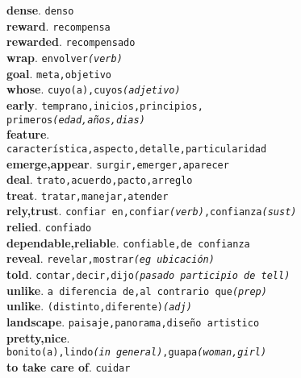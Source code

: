 \documentclass[twocolumn]{article}
\begin{document}
	\textsf{\textbf{dense}}. \texttt{denso}\\
	\textsf{\textbf{reward}}. \texttt{recompensa}\\
	\textsf{\textbf{rewarded}}. \texttt{recompensado}\\
	\textsf{\textbf{wrap}}. \texttt{envolver{\scriptsize \textsl{(verb)}}}\\
	\textsf{\textbf{goal}}. \texttt{meta,objetivo}\\
	\textsf{\textbf{whose}}. \texttt{cuyo(a),cuyos{\scriptsize \textsl{(adjetivo)}}}\\
	\textsf{\textbf{early}}. \texttt{temprano,inicios,principios,\\primeros{\scriptsize \textsl{(edad,a\~nos,dias)}}}\\
	\textsf{\textbf{feature}}.\\\texttt{caracter\'istica,aspecto,detalle,particularidad}\\
	\textsf{\textbf{emerge,appear}}. \texttt{surgir,emerger,aparecer}\\
	\textsf{\textbf{deal}}. \texttt{trato,acuerdo,pacto,arreglo}\\
	\textsf{\textbf{treat}}. \texttt{tratar,manejar,atender}\\
	\textsf{\textbf{rely,trust}}. \texttt{confiar en,confiar{\scriptsize \textsl{(verb)}},confianza{\scriptsize \textsl{(sust)}}}\\
	\textsf{\textbf{relied}}. \texttt{confiado}\\
	\textsf{\textbf{dependable,reliable}}. \texttt{confiable,de confianza}\\
	\textsf{\textbf{reveal}}. \texttt{revelar,mostrar{\scriptsize \textsl{(eg ubicaci\'on)}}}\\
	\textsf{\textbf{told}}. \texttt{contar,decir,dijo{\scriptsize \textsl{(pasado participio de tell)}}}\\
	\textsf{\textbf{unlike}}. \texttt{a diferencia de,al contrario que{\scriptsize \textsl{(prep)}}}\\
	\textsf{\textbf{unlike}}. \texttt{(distinto,diferente){\scriptsize \textsl{(adj)}}}\\
	\textsf{\textbf{landscape}}. \texttt{paisaje,panorama,dise\~no artistico}\\
	\textsf{\textbf{pretty,nice}}.\\\texttt{bonito(a),lindo{\scriptsize \textsl{(in general)}},guapa{\scriptsize \textsl{(woman,girl)}}}\\
	\textsf{\textbf{to take care of}}. \texttt{cuidar}\\
\end{document}
